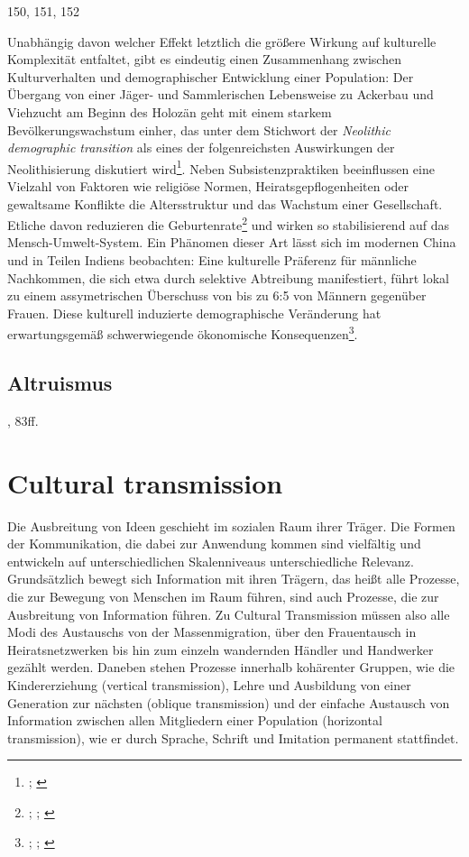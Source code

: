 \documentclass[openany,twoside,twocolumn]{book}
\let\rmarkdownfootnote\footnote%
\def\footnote{\protect\rmarkdownfootnote}
\begin{document}
150, 151, 152

Unabhängig davon welcher Effekt letztlich die größere Wirkung auf
kulturelle Komplexität entfaltet, gibt es eindeutig einen Zusammenhang
zwischen Kulturverhalten und demographischer Entwicklung einer
Population: Der Übergang von einer Jäger- und Sammlerischen Lebensweise
zu Ackerbau und Viehzucht am Beginn des Holozän geht mit einem starkem
Bevölkerungswachstum einher, das unter dem Stichwort der \emph{Neolithic
demographic transition} als eines der folgenreichsten Auswirkungen der
Neolithisierung diskutiert wird\footnote{\textcite{bocquetappel_paleoanthropological_2002};
  \textcite{gage_what_2009}}. Neben Subsistenzpraktiken beeinflussen
eine Vielzahl von Faktoren wie religiöse Normen, Heiratsgepflogenheiten
oder gewaltsame Konflikte die Altersstruktur und das Wachstum einer
Gesellschaft. Etliche davon reduzieren die Geburtenrate\footnote{\textcite{smith_cultural_1992};
  \textcite{colleran_cultural_2016}; \textcite{richerson_natural_1984}}
und wirken so stabilisierend auf das Mensch-Umwelt-System. Ein Phänomen
dieser Art lässt sich im modernen China und in Teilen Indiens
beobachten: Eine kulturelle Präferenz für männliche Nachkommen, die sich
etwa durch selektive Abtreibung manifestiert, führt lokal zu einem
assymetrischen Überschuss von bis zu 6:5 von Männern gegenüber Frauen.
Diese kulturell induzierte demographische Veränderung hat
erwartungsgemäß schwerwiegende ökonomische Konsequenzen\footnote{\textcite{banister_shortage_2004};
  \textcite{li_cultural_2000}; \textcite{tuljapurkar_high_1995}}.

\hypertarget{altruismus}{%
\subsection{Altruismus}\label{altruismus}}

\textcite{smith_cultural_1992}, 83ff.

\hypertarget{cultural-transmission}{%
\section{Cultural transmission}\label{cultural-transmission}}

Die Ausbreitung von Ideen geschieht im sozialen Raum ihrer Träger. Die
Formen der Kommunikation, die dabei zur Anwendung kommen sind vielfältig
und entwickeln auf unterschiedlichen Skalenniveaus unterschiedliche
Relevanz. Grundsätzlich bewegt sich Information mit ihren Trägern, das
heißt alle Prozesse, die zur Bewegung von Menschen im Raum führen, sind
auch Prozesse, die zur Ausbreitung von Information führen. Zu Cultural
Transmission müssen also alle Modi des Austauschs von der
Massenmigration, über den Frauentausch in Heiratsnetzwerken bis hin zum
einzeln wandernden Händler und Handwerker gezählt werden. Daneben stehen
Prozesse innerhalb kohärenter Gruppen, wie die Kindererziehung (vertical
transmission), Lehre und Ausbildung von einer Generation zur nächsten
(oblique transmission) und der einfache Austausch von Information
zwischen allen Mitgliedern einer Population (horizontal transmission),
wie er durch Sprache, Schrift und Imitation permanent stattfindet.
\end{document}
